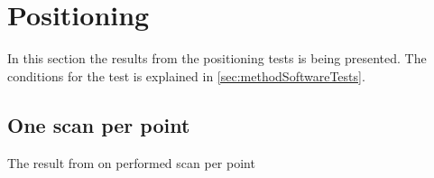 \section{Positioning}\label{sec:resultPos}
In this section the results from the positioning tests is being presented.
The conditions for the test is explained in \cref{sec:methodSoftwareTests}.
\subsection{One scan per point}\label{sec:resultPosOneScan}
The result from on performed scan per point
